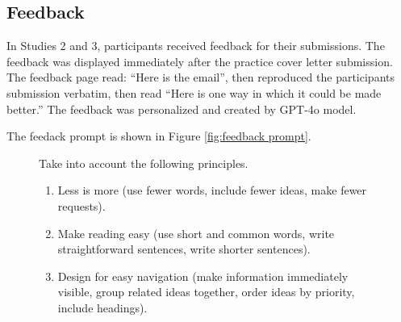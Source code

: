 \documentclass[11pt]{report}
\begin{document}
\begin{append}


\subsection{Feedback}\label{sec:feedback}

In Studies 2 and 3, participants received feedback for their submissions. The feedback was displayed immediately after the practice cover letter submission. The feedback page read: ``Here is the email'', then reproduced the participants submission verbatim, then read ``Here is one way in which it could be made better.'' The feedback was personalized and created by GPT-4o model. 

The feedack prompt is shown in Figure \ref{fig:feedback prompt}.
\begin{figure}
    \centering
    \begin{tcolorbox}[colback=blue!5!white, colframe=blue!75!black, title=Feedback prompt]
Take into account the following principles. 
\begin{enumerate}
    \item Less is more (use fewer words, include fewer ideas, make fewer requests).

\item Make reading easy (use short and common words, write straightforward sentences, write shorter sentences).

\item Design for easy navigation (make information immediately visible, group related ideas together, order ideas by priority, include headings).


\end{enumerate}
\end{tcolorbox}
\end{figure}
\end{append}
\end{document}
